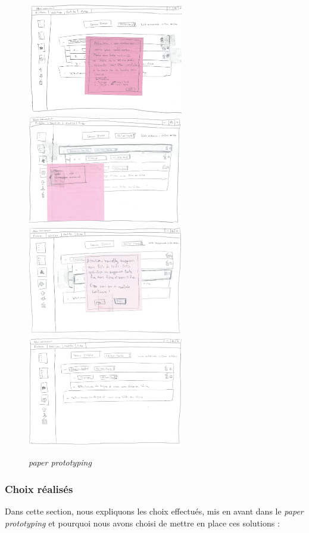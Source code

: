 \documentclass[a4paper,10pt]{article}
\newcommand{\paperPrototyping}{\emph{paper prototyping}}
\begin{document}
\begin{figure}[H]
    \includegraphics[width=6.8cm]{Images/maquette5.jpeg}
    \includegraphics[width=6.8cm]{Images/maquette6.jpeg}
    \includegraphics[width=6.8cm]{Images/maquette7.jpeg}
    \includegraphics[width=6.8cm]{Images/maquette8.jpeg}
    \caption{\paperPrototyping}
\end{figure}

\subsubsection{Choix réalisés}
Dans cette section, nous expliquons les choix effectués, mis en avant dans le \paperPrototyping{} et pourquoi nous avons choisi de mettre en place ces solutions
:
\end{document}
